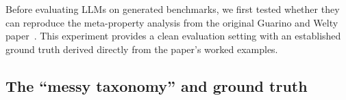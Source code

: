 \documentclass{IOS-Book-Article}
\begin{document}
% 
% 
% 
% 
% 
% 
% 
% 

Before evaluating LLMs on generated benchmarks, we first tested
whether they can reproduce the meta-property analysis from the
original Guarino and Welty paper~\cite{guarino2000formal}.  This
experiment provides a clean evaluation setting with an established
ground truth derived directly from the paper's worked examples.

\subsection{The ``messy taxonomy'' and ground truth}
\end{document}
